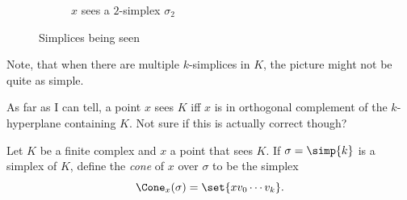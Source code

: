 \begin{figure}[H]
\begin{subfigure}{.49\linewidth}
    \caption{$x$ sees a $2$-simplex $\sigma_2$}
    \label{fig:see-sigma-2}
  \end{subfigure}
  \caption{Simplices being seen}
  \label{fig:seeing}
\end{figure}
\begin{remark}
  Note, that when there are multiple $k$-simplices in $K$, the picture might not
  be quite as simple.
\end{remark}
\begin{remark}
  As far as I can tell, a point $x$ sees $K$ iff $x$ is in orthogonal complement
  of the $k$-hyperplane containing $K$. Not sure if this is actually correct
  though?
\end{remark}
\begin{definition}
  Let $K$ be a finite complex and $x$ a point that sees $K$. If $\sigma =
  \simp{k}$ is a simplex of $K$, define the \emph{cone} of $x$ over $\sigma$ to
  be the simplex
  \[
    \Cone_x(\sigma) = \set{xv_0\cdots v_k}.
  \]
\end{definition}
